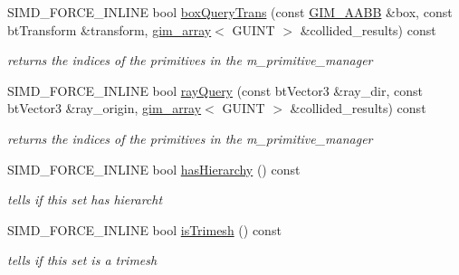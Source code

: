 \begin{DoxyCompactItemize}
\mbox{\label{classGIM__BOX__TREE__TEMPLATE__SET_a7bbe0306a940c9027362af374ac95c5e}} 
S\+I\+M\+D\+\_\+\+F\+O\+R\+C\+E\+\_\+\+I\+N\+L\+I\+NE bool \hyperlink{classGIM__BOX__TREE__TEMPLATE__SET_a7bbe0306a940c9027362af374ac95c5e}{box\+Query\+Trans} (const \hyperlink{classGIM__AABB}{G\+I\+M\+\_\+\+A\+A\+BB} \&box, const bt\+Transform \&transform, \hyperlink{classgim__array}{gim\+\_\+array}$<$ G\+U\+I\+NT $>$ \&collided\+\_\+results) const
\begin{DoxyCompactList}\small\item\em returns the indices of the primitives in the m\+\_\+primitive\+\_\+manager \end{DoxyCompactList}\item 
\mbox{\label{classGIM__BOX__TREE__TEMPLATE__SET_ad5eeb69c9aa08a8162b69d6e4531330d}} 
S\+I\+M\+D\+\_\+\+F\+O\+R\+C\+E\+\_\+\+I\+N\+L\+I\+NE bool \hyperlink{classGIM__BOX__TREE__TEMPLATE__SET_ad5eeb69c9aa08a8162b69d6e4531330d}{ray\+Query} (const bt\+Vector3 \&ray\+\_\+dir, const bt\+Vector3 \&ray\+\_\+origin, \hyperlink{classgim__array}{gim\+\_\+array}$<$ G\+U\+I\+NT $>$ \&collided\+\_\+results) const
\begin{DoxyCompactList}\small\item\em returns the indices of the primitives in the m\+\_\+primitive\+\_\+manager \end{DoxyCompactList}\item 
\mbox{\label{classGIM__BOX__TREE__TEMPLATE__SET_a24686e0ae5cdde9e7e5eb8bce74e597e}} 
S\+I\+M\+D\+\_\+\+F\+O\+R\+C\+E\+\_\+\+I\+N\+L\+I\+NE bool \hyperlink{classGIM__BOX__TREE__TEMPLATE__SET_a24686e0ae5cdde9e7e5eb8bce74e597e}{has\+Hierarchy} () const
\begin{DoxyCompactList}\small\item\em tells if this set has hierarcht \end{DoxyCompactList}\item 
\mbox{\label{classGIM__BOX__TREE__TEMPLATE__SET_a58be3bd10ea7c89c369084cbba655bbc}} 
S\+I\+M\+D\+\_\+\+F\+O\+R\+C\+E\+\_\+\+I\+N\+L\+I\+NE bool \hyperlink{classGIM__BOX__TREE__TEMPLATE__SET_a58be3bd10ea7c89c369084cbba655bbc}{is\+Trimesh} () const
\begin{DoxyCompactList}\small\item\em tells if this set is a trimesh \end{DoxyCompactList}\item 

\end{DoxyCompactItemize}
